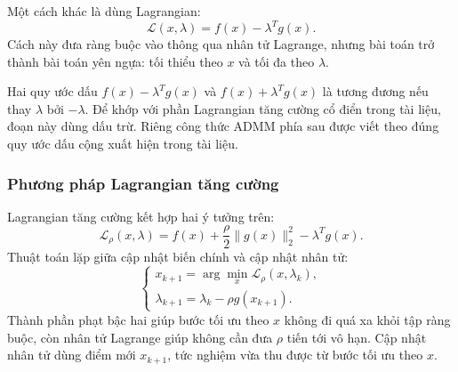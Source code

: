 Một cách khác là dùng Lagrangian:
\begin{equation}
    \mathcal{L}(x,\lambda)=f(x)-\lambda^{T}g(x).
    \label{eq_lagrangian_basic}
\end{equation}
Cách này đưa ràng buộc vào thông qua nhân tử Lagrange, nhưng bài toán trở thành bài toán yên ngựa: tối thiểu theo $x$ và tối đa theo $\lambda$.
\begin{cy}
    Hai quy ước dấu $f(x)-\lambda^{T}g(x)$ và $f(x)+\lambda^{T}g(x)$ là tương đương nếu thay $\lambda$ bởi $-\lambda$. Để khớp với phần Lagrangian tăng cường cổ điển trong tài liệu, đoạn này dùng dấu trừ. Riêng công thức ADMM phía sau được viết theo đúng quy ước dấu cộng xuất hiện trong tài liệu.
\end{cy}

\subsubsection*{Phương pháp Lagrangian tăng cường}
Lagrangian tăng cường kết hợp hai ý tưởng trên:
\begin{equation}
    \mathcal{L}_{\rho}(x,\lambda)
    =
    f(x)+\frac{\rho}{2}\|g(x)\|_2^2-\lambda^{T}g(x).
    \label{eq_augmented_lagrangian}
\end{equation}
Thuật toán lặp giữa cập nhật biến chính và cập nhật nhân tử:
\begin{equation}
    \begin{cases}
        x_{k+1}=\arg\min_x \mathcal{L}_{\rho}(x,\lambda_k),\\
        \lambda_{k+1}=\lambda_k-\rho g(x_{k+1}).
    \end{cases}
    \label{eq_augmented_lagrangian_steps}
\end{equation}
Thành phần phạt bậc hai giúp bước tối ưu theo $x$ không đi quá xa khỏi tập ràng buộc, còn nhân tử Lagrange giúp không cần đưa $\rho$ tiến tới vô hạn. Cập nhật nhân tử dùng điểm mới $x_{k+1}$, tức nghiệm vừa thu được từ bước tối ưu theo $x$.

